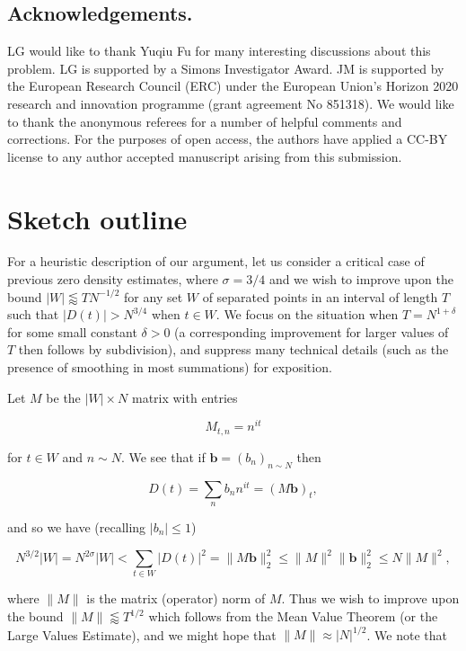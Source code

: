 \documentclass{amsart}
\theoremstyle{plain}
\numberwithin{equation}{section}
\begin{document}
\subsection{Acknowledgements.} LG would like to thank Yuqiu Fu for many interesting discussions about this problem.  
LG is supported by a Simons Investigator Award. JM is supported  by the European Research Council (ERC) under the European Union’s
 Horizon 2020 research and innovation programme (grant agreement No 851318). We would like to thank the anonymous referees for a number of helpful comments and corrections. For the purposes of open access, the authors have applied a CC-BY license to any author accepted manuscript arising from this submission.

%
%
%
%


\section{Sketch outline}

For a heuristic description of our argument, let us consider a critical case of previous zero density estimates, where $\sigma = 3/4$ and we wish to improve upon the bound $|W|\lessapprox TN^{-1/2}$ for any set $W$ of separated points in an interval of length $T$ such that $|D(t)|>N^{3/4}$ when $t\in W$. We focus on the situation when $T=N^{1+\delta}$ for some small constant $\delta>0$ (a corresponding improvement for larger values of $T$ then follows by subdivision), and suppress many technical details (such as the presence of smoothing in most summations) for exposition. 

Let $M$ be the $|W|\times N$ matrix with entries

\[
M_{t,n}=n^{it}
\]

for $t\in W$ and $n\sim N$. We see that if $\mathbf{b}=(b_n)_{n\sim N}$ then

\[
D(t)=\sum_{n}b_n n^{it}=(M\mathbf{b} )_t,
\]

and so we have (recalling $|b_n|\le 1$)

\[
N^{3/2}|W|=N^{2\sigma} |W|<\sum_{t\in W}|D(t)|^2=\|M\mathbf{b}\|_2^2\le \|M\|^2 \|\mathbf{b}\|_2^2\le N\|M\|^2,
\]

where $\|M\|$ is the matrix (operator) norm of $M$. Thus we wish to improve upon the bound $\|M\|\lessapprox T^{1/2}$ which follows from the Mean Value Theorem (or the Large Values Estimate), and we might hope that $\|M\|\approx |N|^{1/2}$. We note that
\end{document}
